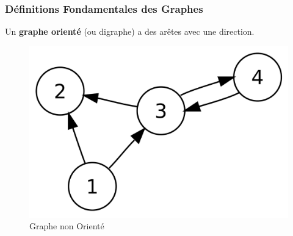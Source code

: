 \begin{frame}
\frametitle{Définitions Fondamentales des Graphes}

\begin{tcolorbox}[colback=orange!10,colframe=orange!100!black,
    title=Graphe Orienté]
Un \textbf{graphe orienté} (ou digraphe) a des arêtes avec une direction.
\end{tcolorbox}

\begin{figure}[H]
    \centering
    \includegraphics[width=0.5 \textwidth]{Figures/grapheOriente.png}
    \caption{Graphe non Orienté}
    \label{fig:Graphe Orienté}
\end{figure}

\end{frame}